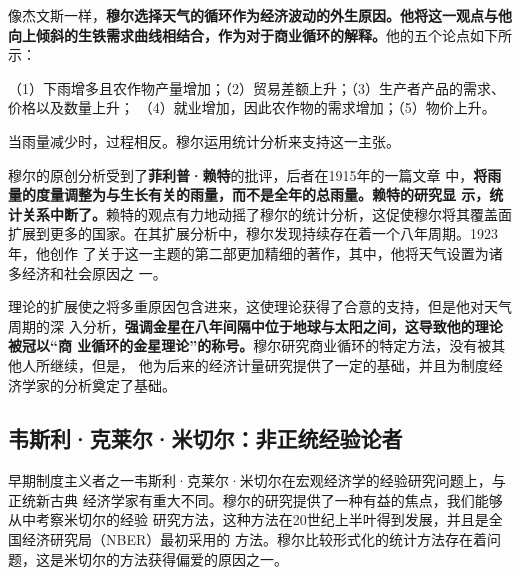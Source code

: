 像杰文斯一样，\textbf{穆尔选择天气的循环作为经济波动的外生原因。他将这一观点与他
  向上倾斜的生铁需求曲线相结合，作为对于商业循环的解释。}他的五个论点如下所示：

（1）下雨增多且农作物产量增加；（2）贸易差额上升；（3）生产者产品的需求、价格以及数量上升；
（4）就业增加，因此农作物的需求增加；（5）物价上升。

当雨量减少时，过程相反。穆尔运用统计分析来支持这一主张。

穆尔的原创分析受到了\textbf{菲利普·赖特}的批评，后者在1915年的一篇文章
中，\textbf{将雨量的度量调整为与生长有关的雨量，而不是全年的总雨量。赖特的研究显
  示，统计关系中断了。}赖特的观点有力地动摇了穆尔的统计分析，这促使穆尔将其覆盖面
扩展到更多的国家。在其扩展分析中，穆尔发现持续存在着一个八年周期。1923年，他创作
了关于这一主题的第二部更加精细的著作，其中，他将天气设置为诸多经济和社会原因之
一。

理论的扩展使之将多重原因包含进来，这使理论获得了合意的支持，但是他对天气周期的深
入分析，\textbf{强调金星在八年间隔中位于地球与太阳之间，这导致他的理论被冠以“商
  业循环的金星理论”的称号。}穆尔研究商业循环的特定方法，没有被其他人所继续，但是，
他为后来的经济计量研究提供了一定的基础，并且为制度经济学家的分析奠定了基础。

\subsection{韦斯利·克莱尔·米切尔：非正统经验论者}

早期制度主义者之一韦斯利·克莱尔·米切尔在宏观经济学的经验研究问题上，与正统新古典
经济学家有重大不同。穆尔的研究提供了一种有益的焦点，我们能够从中考察米切尔的经验
研究方法，这种方法在20世纪上半叶得到发展，并且是全国经济研究局（NBER）最初采用的
方法。穆尔比较形式化的统计方法存在着问题，这是米切尔的方法获得偏爱的原因之一。

